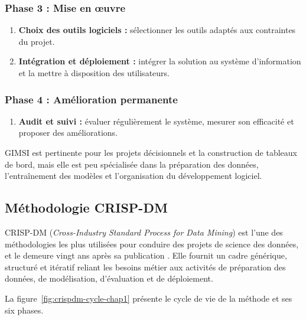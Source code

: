 \subsubsection*{Phase 3 : Mise en œuvre}

\begin{enumerate}[label=\arabic*.,start=8]
    \item \textbf{Choix des outils logiciels :} sélectionner les outils adaptés aux contraintes du projet.
    \item \textbf{Intégration et déploiement :} intégrer la solution au système d'information et la mettre à disposition des utilisateurs.
\end{enumerate}

\subsubsection*{Phase 4 : Amélioration permanente}

\begin{enumerate}[label=\arabic*.,start=10]
    \item \textbf{Audit et suivi :} évaluer régulièrement le système, mesurer son efficacité et proposer des améliorations.
\end{enumerate}

GIMSI est pertinente pour les projets décisionnels et la construction de tableaux de bord, mais elle est peu spécialisée dans la préparation des données, l'entraînement des modèles et l'organisation du développement logiciel.

\subsection{Méthodologie CRISP-DM}

CRISP-DM (\textit{Cross-Industry Standard Process for Data Mining}) \cite{chapman2000crisp,wirth2000crisp,shearer2000crisp} est l'une des méthodologies les plus utilisées pour conduire des projets de science des données, et le demeure vingt ans après sa publication \cite{martinez2021crisp,schroer2021systematic}. Elle fournit un cadre générique, structuré et itératif reliant les besoins métier aux activités de préparation des données, de modélisation, d'évaluation et de déploiement.

La figure~\ref{fig:crispdm-cycle-chap1} présente le cycle de vie de la méthode et ses six phases.

